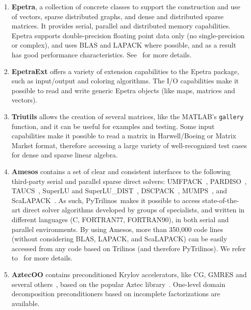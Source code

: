\documentclass[acmtocl]{acmtrans2m}
\newcommand{\PyTrilinos}{{PyTrilinos}}
\begin{document}
\begin{enumerate}

\item {\bf Epetra}, a collection of concrete classes to support the
  construction and use of vectors, sparse distributed graphs, and
  dense and distributed sparse matrices. It provides serial, parallel
  and distributed memory capabilities. Epetra supports
  double-precision floating point data only (no single-precision or
  complex), and uses BLAS and LAPACK where possible, and as a result
  has good performance characteristics.  See~\cite{epetra-guide} for
  more details.

\item {\bf EpetraExt} offers a variety of extension capabilities to
  the Epetra package, such as input/output and coloring algorithms.
  The I/O capabilities make it possible to read and write generic
  Epetra objects (like maps, matrices and vectors).

\item {\bf Triutils} allows the creation of several matrices, like the
  MATLAB's {\tt gallery} function, and it can be useful for examples
  and testing. Some input capabilities make it possible to read a
  matrix in Harwell/Boeing or Matrix Market format, therefore
  accessing a large variety of well-recognized test cases for dense
  and sparse linear algebra.

\item {\bf Amesos} contains a set of clear and consistent interfaces
  to the following third-party serial and parallel sparse direct
  solvers: UMFPACK~\cite{umfpack-acm-toms},
  PARDISO~\cite{oskl:04-etna,sg:04-fgcs},
  TAUCS~\cite{rozin04locality,rotkin04design,irony04parallel}, SuperLU and
  SuperLU\_DIST~\cite{superlu-manual}, DSCPACK~\cite{dscpack-manual},
  MUMPS~\cite{mumps-manual}, and
  ScaLAPACK~\cite{scalapack-book,scalapack}. As such,
  \PyTrilinos\ makes it possible to access state-of-the-art direct
  solver algorithms developed by groups of specialists, and written in
  different languages (C, FORTRAN77, FORTRAN90), in both serial and
  parallel environments. By using Amesos, more than 350,000 code lines
  (without considering BLAS, LAPACK, and ScaLAPACK) can be easily
  accessed from any code based on Trilinos (and therefore PyTrilinos).
  We refer to~\cite{Amesos-Reference-Guide,Amesos-Design}
  for more details.

\item {\bf AztecOO} contains preconditioned Krylov accelerators, like
  CG, GMRES and several others~\cite{golub96matrix}, based on the
  popular Aztec library~\cite{aztecoo-guide}.  One-level domain
  decomposition preconditioners based on incomplete factorizations are
  available.


\end{enumerate}
\end{document}
